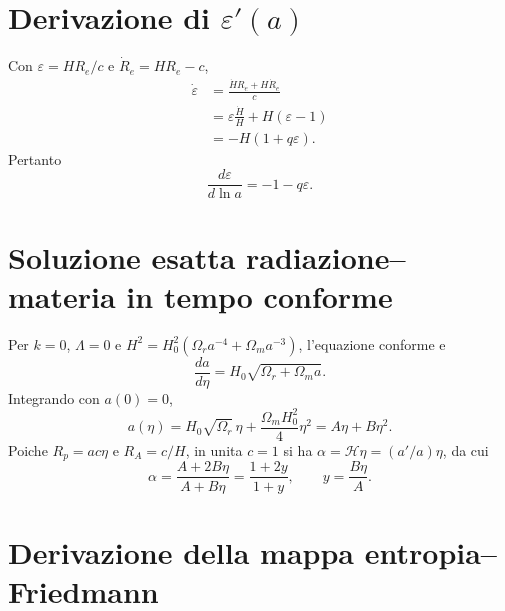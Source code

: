 \documentclass[11pt,a4paper]{article}
\begin{document}
\section{Derivazione di $\varepsilon'(a)$}

Con $\varepsilon=HR_e/c$ e $\dot R_e=HR_e-c$,
\begin{align}
\dot\varepsilon
&=\frac{\dot H R_e+H\dot R_e}{c}\\
&=\varepsilon\frac{\dot H}{H}+H(\varepsilon-1)\\
&=-H(1+q\varepsilon).
\end{align}
Pertanto
\begin{equation}
\boxed{\frac{d\varepsilon}{d\ln a}=-1-q\varepsilon.}
\end{equation}

\section{Soluzione esatta radiazione--materia in tempo conforme}

Per $k=0$, $\Lambda=0$ e $H^2=H_0^2(\Omega_r a^{-4}+\Omega_m a^{-3})$, l'equazione conforme e
\begin{equation}
\frac{da}{d\eta}=H_0\sqrt{\Omega_r+\Omega_m a}.
\end{equation}
Integrando con $a(0)=0$,
\begin{equation}
a(\eta)=H_0\sqrt{\Omega_r}\,\eta+\frac{\Omega_m H_0^2}{4}\eta^2
=A\eta+B\eta^2.
\end{equation}
Poiche $R_p=ac\eta$ e $R_A=c/H$, in unita $c=1$ si ha $\alpha=\mathcal H\eta=(a'/a)\eta$, da cui
\begin{equation}
\alpha=\frac{A+2B\eta}{A+B\eta}=\frac{1+2y}{1+y},\qquad y=\frac{B\eta}{A}.
\end{equation}


\section{Derivazione della mappa entropia--Friedmann}
\end{document}

